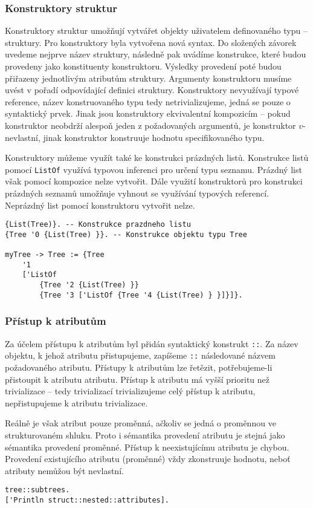 \subsubsection{Konstruktory struktur}

Konstruktory struktur umožňují vytvářet objekty uživatelem definovaného typu -- struktury.
Pro konstruktory byla vytvořena nová syntax. Do složených závorek uvedeme nejprve název struktury,
následně pak uvádíme konstrukce, které budou provedeny jako konstituenty konstruktoru. Výsledky
provedení poté budou přiřazeny jednotlivým atributům struktury. Argumenty konstruktoru musíme uvést
v pořadí odpovídající definici struktury. Konstruktory nevyužívají typové reference, název
konstruovaného typu tedy netrivializujeme, jedná se pouze o syntaktický prvek. Jinak jsou
konstruktory ekvivalentní kompozicím -- pokud konstruktor neobdrží alespoň jeden z požadovaných
argumentů, je konstruktor $v$-nevlastní, jinak konstruktor konstruuje hodnotu specifikovaného typu.

Konstruktory můžeme využít také ke konstrukci prázdných listů. Konstrukce listů pomocí
\lstinline{ListOf} využívá typovou inferenci pro určení typu seznamu. Prázdný list však pomocí
kompozice nelze vytvořit. Dále využití konstruktorů pro konstrukci prázdných seznamů umožňuje
vyhnout se využívání typových referencí. Neprázdný list pomocí konstruktoru vytvořit nelze.

\begin{lstlisting}[caption={Příklad definice struktury}]
{List(Tree)}. -- Konstrukce prazdneho listu
{Tree '0 {List(Tree) }}. -- Konstrukce objektu typu Tree

myTree -> Tree := {Tree
    '1
    ['ListOf 
        {Tree '2 {List(Tree) }}
        {Tree '3 ['ListOf {Tree '4 {List(Tree) } }]}]}.
\end{lstlisting}

\subsubsection{Přístup k atributům}

Za účelem přístupu k atributům byl přidán syntaktický konstrukt \lstinline{::}. Za název objektu,
k jehož atributu přistupujeme, zapíšeme \lstinline{::} následované názvem požadovaného atributu.
Přístupy k atributům lze řetězit, potřebujeme-li přistoupit k atributu atributu. Přístup k atributu
má vyšší prioritu než trivializace -- tedy trivializací trivializujeme celý přístup k atributu,
nepřistupujeme k atributu trivializace.

Reálně je však atribut pouze proměnná, ačkoliv se jedná o proměnnou ve strukturovaném shluku.
Proto i sémantika provedení atributu je stejná jako sémantika provedení proměnné. Přístup
k neexistujícímu atributu je chybou. Provedení existujícího atributu (proměnné) vždy zkonstruuje
hodnotu, neboť atributy nemůžou být nevlastní.

\begin{lstlisting}[caption={Příklad přístupu k atributům objektu}]
tree::subtrees.
['Println struct::nested::attributes].
\end{lstlisting}

\endinput
